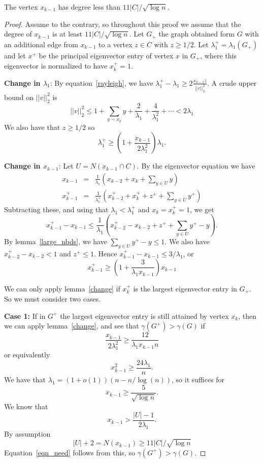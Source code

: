 \begin{lemma}\label{k_1_pre_lemma}
 The vertex $x_{k-1}$ has degree less than $11 |C| / \sqrt{\log n}$.  
\end{lemma}
\begin{proof}
  Assume to the contrary, so throughout this proof we assume that
  the degree of $x_{k-1}$ is at least $11 |C| / \sqrt{\log n}$.
  Let $G_+$ the graph obtained form $G$ with
  an additional edge from $x_{k-1}$ to a vertex $z \in C$ with $z \geq 1/2$.
  Let $\lambda^+_1 = \lambda_1(G_+)$ and  let $x^+$ be the principal eigenvector
  entry of vertex $x$ in $G_+$, where this eigenvector is normalized to have
  $x_{k}^+ = 1$.


  \noindent \textbf{Change in $\lambda_1$}: By equation~\ref{rayleigh}, we
  have $\lambda_1^+ - \lambda_1 \geq 2 \frac{x_{k-1} z}{||v||^2_2}$.
  A crude upper bound on $||v||_2^2$ is
   \[ ||v||_2^2 \leq 1 + \sum_{y \sim x_{k}} y + \frac{2}{\lambda_1} + \frac{4}{\lambda_1^2} + \cdots < 2 \lambda_1 \]
  We also have that $z \geq 1/2$ so
   \[ \lambda_1^+ \geq \left( 1 + \frac{x_{k-1}}{2\lambda_1^2} \right) \lambda_1 .\]

  \noindent \textbf{Change in $x_{k-1}$}:  Let $U = N(x_{k-1} \cap C)$.
  By the eigenvector equation we have
  \begin{eqnarray*}
    x_{k-1} & = & \frac{1}{\lambda_1} \left( x_{k-2} + x_{k} + \sum_{y \in U} y \right) \\
    x_{k-1}^+ & = & \frac{1}{\lambda_1^+} \left( x_{k-2}^+ + x_{k}^+ + z^+ + \sum_{y \in U} y^+ \right)    
  \end{eqnarray*}
  Subtracting these, and using that $\lambda_1 < \lambda_1^+$ and $x_k = x_k^+ = 1$, we get
   \[ x_{k-1}^+ - x_{k-1} \leq \frac{1}{\lambda_1} \left( x_{k-2}^+ - x_{k-2} + z^+ + \sum_{y \in U} y^+ - y\right) .\]
  By lemma~\ref{large_nbds}, we have $\sum_{y \in U} y^+ - y \leq 1$.  We also have
  $x_{k-2}^+ - x_{k-2} < 1$ and $z^+ \leq 1$.  Hence $x_{k-1}^+ - x_{k-1} \leq 3 / \lambda_1$,
  or
   \[ x_{k-1}^+ \geq \left( 1 + \frac{3}{\lambda_1 x_{k-1}} \right) x_{k-1}\]


  We can only apply lemma~\ref{change} if $x_{k}^+$ is the
  largest eigenvector entry in $G_+$.  So we must consider two cases.


  \noindent \textbf{Case 1:} If in
  $G^+$ the largest eigenvector entry is still attained by vertex $x_k$, then
  we can apply lemma~\ref{change}, and see that $\gamma(G^+) > \gamma(G)$
  if
   \[ \frac{x_{k-1}}{2 \lambda_1^2} \geq \frac{12}{\lambda_1 x_{k-1} n} \]
  or equivalently
   \[ x_{k-1}^2 \geq \frac{24 \lambda_1}{n} .\]
  We have that $\lambda_1 = (1+o(1)) (n - n / \log(n))$, so it suffices for
  \begin{equation}\label{eqn_need}
   x_{k-1} \geq \frac{5}{\sqrt{\log n}} .
  \end{equation}
  We know that
   \[ x_{k-1} > \frac{|U| - 1}{2 \lambda_1} .\]
  By assumption
   \[ |U| + 2 = N(x_{k-1}) \geq 11 |C| / \sqrt{\log n} \]
  Equation~\ref{eqn_need} follows from this, so $\gamma(G^+) > \gamma(G)$.  


\end{proof}
